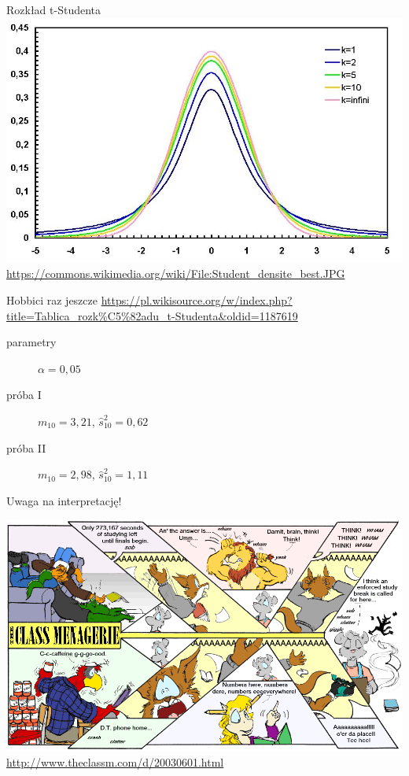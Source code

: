 \documentclass{mp}
\begin{document}
\begin{frame}{Rozkład t-Studenta}
\includegraphics[width=\textwidth]{16_statystyka/tsudent.jpg}\\
\small\url{https://commons.wikimedia.org/wiki/File:Student_densite_best.JPG}
\end{frame}

\begin{frame}{Hobbici raz jeszcze}
\url{https://pl.wikisource.org/w/index.php?title=Tablica_rozk\%C5\%82adu_t-Studenta&oldid=1187619}
\begin{description}
\item[parametry] $\alpha=0{,}05$
\pause
\item[próba I] $m_{10}=3{,}21$, $\hat{s}^2_{10}=0{,}62$
\pause
\item[próba II] $m_{10}=2{,}98$, $\hat{s}^2_{10}=1{,}11$
\end{description}
\pause
\alert{Uwaga na interpretację!}
\end{frame}

\begin{frame}{}
\includegraphics[width=\textwidth]{16_statystyka/cmc20030601b.png} \\
\vfill
\small\url{http://www.theclassm.com/d/20030601.html}
\end{frame}
\end{document}
